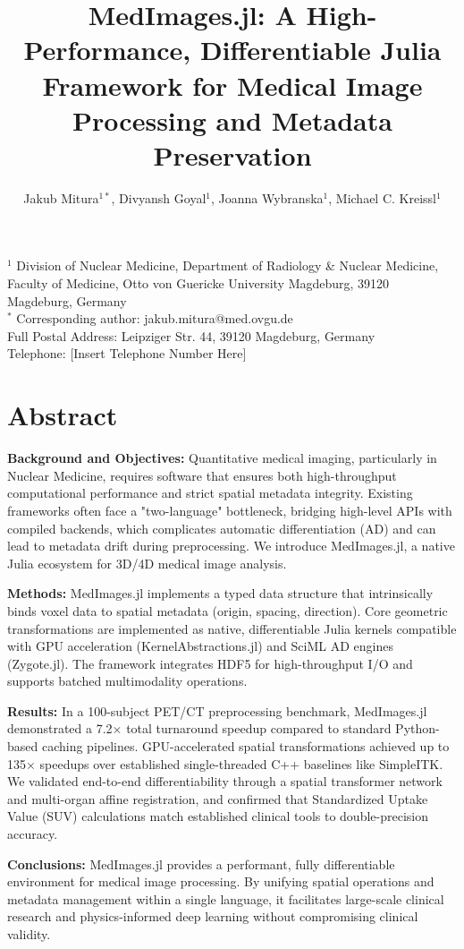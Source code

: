 \documentclass[10pt,letterpaper]{article}
\title{MedImages.jl: A High-Performance, Differentiable Julia Framework for Medical Image Processing and Metadata Preservation}
\author{Jakub Mitura$^{1*}$, Divyansh Goyal$^{1}$, Joanna Wybranska$^{1}$, Michael C. Kreissl$^{1}$}
\date{}
\begin{document}
\maketitle

\noindent
$^{1}$ Division of Nuclear Medicine, Department of Radiology \& Nuclear Medicine, Faculty of Medicine, Otto von Guericke University Magdeburg, 39120 Magdeburg, Germany \\
$^{*}$ Corresponding author: jakub.mitura@med.ovgu.de \\
Full Postal Address: Leipziger Str. 44, 39120 Magdeburg, Germany \\
Telephone: [Insert Telephone Number Here]

\section*{Abstract}
\textbf{Background and Objectives:} Quantitative medical imaging, particularly in Nuclear Medicine, requires software that ensures both high-throughput computational performance and strict spatial metadata integrity. Existing frameworks often face a "two-language" bottleneck, bridging high-level APIs with compiled backends, which complicates automatic differentiation (AD) and can lead to metadata drift during preprocessing. We introduce MedImages.jl, a native Julia ecosystem for 3D/4D medical image analysis.

\textbf{Methods:} MedImages.jl implements a typed data structure that intrinsically binds voxel data to spatial metadata (origin, spacing, direction). Core geometric transformations are implemented as native, differentiable Julia kernels compatible with GPU acceleration (KernelAbstractions.jl) and SciML AD engines (Zygote.jl). The framework integrates HDF5 for high-throughput I/O and supports batched multimodality operations.

\textbf{Results:} In a 100-subject PET/CT preprocessing benchmark, MedImages.jl demonstrated a 7.2$\times$ total turnaround speedup compared to standard Python-based caching pipelines. GPU-accelerated spatial transformations achieved up to 135$\times$ speedups over established single-threaded C++ baselines like SimpleITK. We validated end-to-end differentiability through a spatial transformer network and multi-organ affine registration, and confirmed that Standardized Uptake Value (SUV) calculations match established clinical tools to double-precision accuracy.

\textbf{Conclusions:} MedImages.jl provides a performant, fully differentiable environment for medical image processing. By unifying spatial operations and metadata management within a single language, it facilitates large-scale clinical research and physics-informed deep learning without compromising clinical validity.
\end{document}

